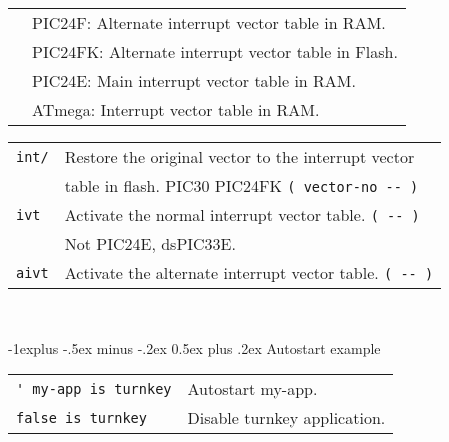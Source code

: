 \documentclass[10pt,landscape,a4paper]{article}
\makeatletter
\renewcommand{\subsection}{\@startsection{subsection}{2}{0mm}%
                                {-1explus -.5ex minus -.2ex}%
                                {0.5ex plus .2ex}%
                                {\normalfont\normalsize\bfseries}}
\makeatother
\begin{document}
\begin{multicols}{3}
\begin{tabular}{@{}ll@{}}
            & PIC24F: Alternate interrupt vector table in RAM. \\
            & PIC24FK: Alternate interrupt vector table in Flash. \\
            & PIC24E: Main interrupt vector table in RAM. \\
            & ATmega: Interrupt vector table in RAM. \\
\end{tabular}
\begin{tabular}{@{}ll@{}}
\verb!int/! & Restore the original vector to the interrupt vector \\
            & table in flash. PIC30 PIC24FK \verb!( vector-no -- )! \\
\verb!ivt!  & Activate the normal interrupt vector table. \verb!( -- )! \\
            & Not PIC24E, dsPIC33E. \\
\verb!aivt! & Activate the alternate interrupt vector table. \verb!( -- )! \\
\end{tabular}\\

\medskip

\subsection{Autostart example}
\begin{tabular}{@{}ll@{}}
\verb!' my-app is turnkey!  & Autostart my-app. \\
\verb!false is turnkey!  & Disable turnkey application. \\
\end{tabular}\\

\medskip


\end{multicols}
\end{document}
